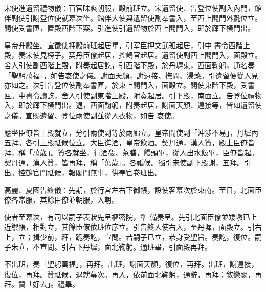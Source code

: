 \begin{pinyinscope}
 宋使進遺留禮物儀：百官昧爽朝服，殿前班立。宋遺留使、告登位使副入內門，館伴副使引謝登位使就幕次坐。館伴大使與遺留使副奉書入，至西上閣門外氈位立。閣使受書匣，置殿西階下案。引進使引遺留物於西上閣門入，即於廊下橫門出。



 皇帝升殿坐。宣徽使押殿前班起居畢，引宰臣押文武班起居，引中
 書令西階上殿，奏宋使見榜子。契丹臣僚起居，控鶴官起居。遺留使副西上閣門入，面殿立。舍人引使副西階上殿，附奏起居訖，引西階下殿，於丹墀東，西面鞠躬，通名奏「聖躬萬福」，如告哀使之儀。謝面天顏，謝遠接、撫問、湯藥。引遺留便從人見亦如之。次引告登位使副奉書匣，於東上閣門入，面殿立。閣使東階下殿，受書匣。中書令讀訖，舍人引使副東階上殿，附奏起居。引下殿，南面立。告登位禮物入，即於廊下橫門出。退，西面鞠躬，附奏起居，謝面天顏、遠接等，皆如遺留使之儀。宣賜遺留、登位兩使副並從人衣物，如告
 哀使。



 應坐臣僚皆上殿就立，分引兩使副等於兩廊立。皇帝間使副「沖涉不易」，丹墀內五拜。各引上殿祗候位立。大臣進酒，皇帝飲酒。契丹通，漢人贊，殿上臣僚皆拜，稱「萬歲」。贊各就坐，行酒殽、茶膳，饅頭畢，從人出水飯畢，臣僚皆起。契丹通，漢人贊，皆再拜，稱「萬歲」。各祗候。獨引宋使副下殿謝，五拜。引出。控鶴官門祗候，報閣門無事，供奉官卷班出。



 高麗、夏國告終儀：先期，於行宮左右下御帳，設使客幕次於東南。至日，北面臣僚各常服，其餘臣僚並朝服，入朝。



 使者至幕次，有司以嗣子表狀先呈樞密院，準
 備奏呈。先引北面臣僚並矮墩已上近禦帳，相對立，其餘臣僚依班位序立。引告終人使右入，至丹墀，面殿立。引右上，立；揖少前，拜，跪奏訖，宣問。若嗣子已立，恭身受聖旨。奏訖，復位。嗣子朱立，不宣問。引右下丹墀，面北鞠躬。通班畢，引面殿再拜。



 不出班，奏「聖躬萬福」，再拜。出班，謝面天顏，復位，再拜。出班，謝遠接，復位，再拜。贊祗候，退就幕次。再入，依前面北鞠躬，通辭，再拜；敘戀闕，再拜。贊「好去」。禮畢。



\end{pinyinscope}